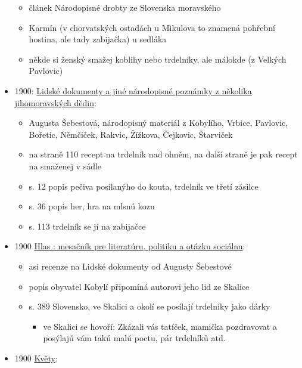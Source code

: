\begin{itemize}
  \begin{itemize}
  \tightlist
  \item
    článek Národopisné drobty ze Slovenska moravského
  \item
    Karmín (v chorvatských ostadách u Mikulova to znamená pohřební
    hostina, ale tady zabijačka) u sedláka
  \item
    někde si ženský smažej koblihy nebo trdelníky, ale málokde (z
    Velkých Pavlovic)
  \end{itemize}
\item
  1900:
  \href{https://ndk.cz/view/uuid:7d517d10-0583-11dd-85d4-000d606f5dc6?page=uuid\%3A445fd636-253c-4b04-b533-3b0a96e7e0b4}{
  Lidské dokumenty a jiné národopisné poznámky z několika jihomoravských
  dědin}:

  \begin{itemize}
  \tightlist
  \item
    Augusta Šebestová, národopisný materiál z Kobylího, Vrbice,
    Pavlovic, Bořetic, Němčiček, Rakvic, Žížkova, Čejkovic, Štarviček
  \item
    na straně 110 recept na trdelník nad ohněm, na další straně je pak
    recept na smaženej v sádle
  \item
    s. 12 popis pečiva posílanýho do kouta, trdelník ve třetí zásilce
  \item
    s. 36 popis her, hra na mlsnú kozu
  \item
    s. 113 trdelník se jí na zabijačce
  \end{itemize}
\item
  1900
  \href{https://dikda.snk.sk/uuid/uuid:7f57fb99-b746-49c2-9b31-a09b7a646c02}{Hlas
  : mesačník pre literatúru, politiku a otázku sociálnu}:

  \begin{itemize}
  \tightlist
  \item
    asi recenze na Lidské dokumenty od Augusty Šebestové
  \item
    popis obyvatel Kobylí připomíná autorovi jeho lid ze Skalice
  \item
    s. 389 Slovensko, ve Skalici a okolí se posílají trdelníky jako
    dárky

    \begin{itemize}
    \tightlist
    \item
      ve Skalici se hovoří: Zkázali vás tatíček, mamička pozdravovat a
      posýlajú vám takú malú poctu, pár trdelníků atd.
    \end{itemize}
  \end{itemize}
\item
  1900
  \href{https://ceskadigitalniknihovna.cz/uuid/uuid:24bda940-8ab0-11ed-8f7f-5ef3fc9bb22f}{Květy}:


\end{itemize}
